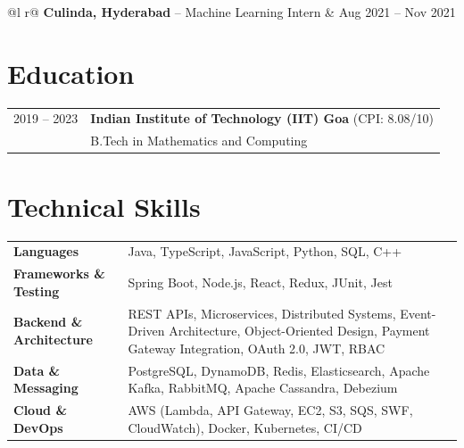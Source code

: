 \documentclass[a4paper,10.5pt]{article}
\begin{document}
\begin{tabularx}{\linewidth}{ @{}l r@{} }
\textbf{Culinda, Hyderabad} -- Machine Learning Intern & \hfill Aug 2021 -- Nov 2021 \\[3.75pt]
\end{tabularx}

\section{Education}
\begin{tabularx}{\linewidth}{@{}l X@{}}	
2019 -- 2023 & \textbf{Indian Institute of Technology (IIT) Goa} \hfill (CPI: 8.08/10) \\
& B.Tech in Mathematics and Computing \\
\end{tabularx}

\section{Technical Skills}
\begin{tabularx}{\linewidth}{@{}l X@{}}
\textbf{Languages} & Java, TypeScript, JavaScript, Python, SQL, C++ \\
\textbf{Frameworks \& Testing} & Spring Boot, Node.js, React, Redux, JUnit, Jest \\
\textbf{Backend \& Architecture} & REST APIs, Microservices, Distributed Systems, Event-Driven Architecture, Object-Oriented Design, Payment Gateway Integration, OAuth 2.0, JWT, RBAC \\
\textbf{Data \& Messaging} & PostgreSQL, DynamoDB, Redis, Elasticsearch, Apache Kafka, RabbitMQ, Apache Cassandra, Debezium \\
\textbf{Cloud \& DevOps} & AWS (Lambda, API Gateway, EC2, S3, SQS, SWF, CloudWatch), Docker, Kubernetes, CI/CD \\
\end{tabularx}
\end{document}
